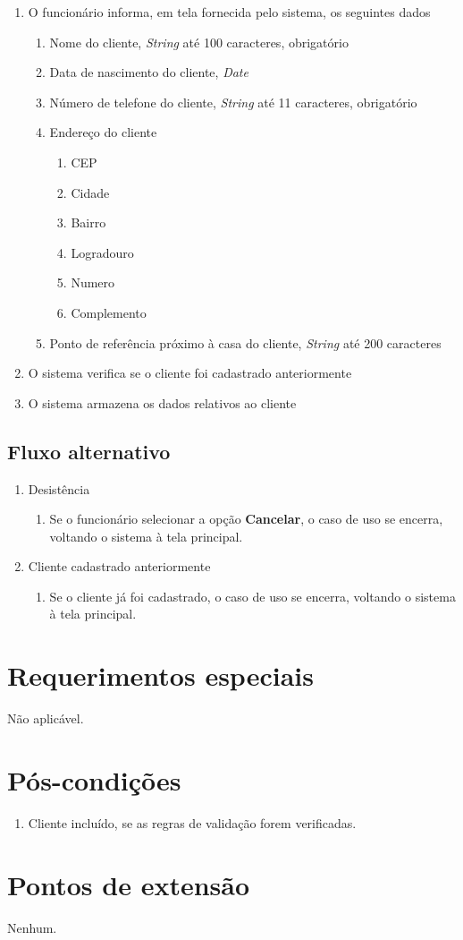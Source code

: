 \begin{enumerate}
	\item O funcionário informa, em tela fornecida pelo sistema, os seguintes dados
	\begin{enumerate}
		\item Nome do cliente, \emph{String} até 100 caracteres, obrigatório
		\item Data de nascimento do cliente, \emph{Date}
		\item Número de telefone do cliente, \emph{String} até 11 caracteres, obrigatório
		\item Endereço do cliente
		\begin{enumerate}
			\item CEP
			\item Cidade
			\item Bairro
			\item Logradouro
			\item Numero
			\item Complemento
		\end{enumerate}
		\item Ponto de referência próximo à casa do cliente, \emph{String} até 200 caracteres
	\end{enumerate}
	\item O sistema verifica se o cliente foi cadastrado anteriormente
	\item O sistema armazena os dados relativos ao cliente
\end{enumerate}

\subsection{Fluxo alternativo}

\begin{enumerate}
	\item Desistência
	\begin{enumerate}
		\item Se o funcionário selecionar a opção \textbf{Cancelar}, o caso de uso se encerra, voltando o
		sistema à tela principal.
	\end{enumerate}
	\item Cliente cadastrado anteriormente
	\begin{enumerate}
		\item Se o cliente já foi cadastrado, o caso de uso se encerra, voltando o
		sistema à tela principal.
	\end{enumerate}
\end{enumerate}

\section{Requerimentos especiais}

Não aplicável.

\section{Pós-condições}

\begin{enumerate}
	\item Cliente incluído, se as regras de validação forem verificadas.
\end{enumerate}

\section{Pontos de extensão}

Nenhum.